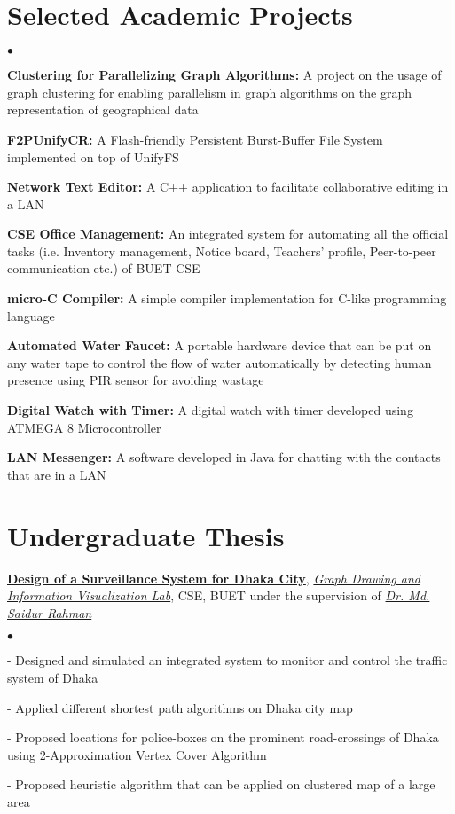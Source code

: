 \documentclass[margin,line]{res}
\newenvironment{list2}{
  \begin{list}{$\bullet$}{%
      \setlength{\itemsep}{0in}
      \setlength{\parsep}{0in} \setlength{\parskip}{0in}
      \setlength{\topsep}{0in} \setlength{\partopsep}{0in} 
      \setlength{\leftmargin}{0.2in}}}{\end{list}}
\begin{document}
\begin{resume}
\section{\sc Selected Academic Projects}
\begin{list2}
\item {\bf Clustering for Parallelizing Graph Algorithms:} A project on the usage of graph clustering for enabling parallelism in graph algorithms on the graph representation of geographical data
\item {\bf F2PUnifyCR:} A Flash-friendly Persistent Burst-Buffer File System implemented on top of UnifyFS
\item {\bf Network Text Editor:} A C++ application to facilitate collaborative editing in a LAN
\item {\bf CSE Office Management:} An integrated system for automating all the official tasks (i.e. Inventory management, Notice board, Teachers' profile, Peer-to-peer communication etc.) of BUET CSE
\item {\bf micro-C Compiler:} A simple compiler implementation for C-like programming language
\item {\bf Automated Water Faucet:} A portable hardware device that can be put on any water tape to control the flow of water automatically by detecting human presence using PIR sensor for avoiding wastage
\item {\bf Digital Watch with Timer:} A digital watch with timer developed using ATMEGA 8 Microcontroller
\item {\bf LAN Messenger:} A software developed in Java for chatting with the contacts that are in a LAN
\end{list2}

\vspace*{-.1in}

\section{\sc Undergraduate Thesis} 
\href{https://cse.buet.ac.bd/research/group/gd/index.php?pageid=SurveillanceSystemDhaka}{\bf{Design of a Surveillance System for Dhaka City}}, \textit{\href{https://cse.buet.ac.bd/research/group/gd/index.php?pageid=Home.htm}{Graph Drawing and Information Visualization Lab}}, CSE, BUET under the supervision of \textit{\href{http://teacher.buet.ac.bd/saidurrahman/}{Dr. Md. Saidur Rahman}}

\begin{list2}
\item[ - ] Designed and simulated an integrated system to monitor and control the traffic system of Dhaka
\item[ - ] Applied different shortest path algorithms on Dhaka city map
\item[ - ] Proposed locations for police-boxes on the prominent road-crossings of Dhaka using 2-Approximation Vertex Cover Algorithm
\item[ - ] Proposed heuristic algorithm that can be applied on clustered map of a large area
\end{list2}
\vspace*{-.1in}


\end{resume}
\end{document}
